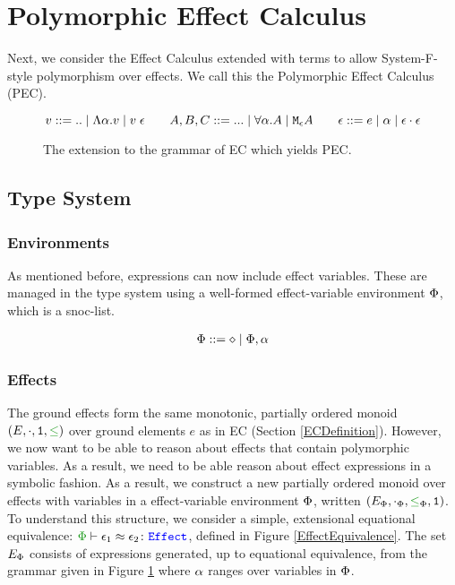 \section{Polymorphic Effect Calculus}


Next, we consider the Effect Calculus extended with terms to allow System-F-style polymorphism over effects. We call this the Polymorphic Effect Calculus (PEC).

\begin{figure}[H]
    \centering
    \begin{framed}
        
\[
    v::=\text{..}\mid\elam{\a}{v}\mid\eapp{v}{\e}
    \quad\quad
    A, B, C::=\text{...}\mid \all{\a}{A}\mid\mea
    \quad\quad
    \e ::= e \mid \a \mid \e\dot\e
\]
    \end{framed}
    \caption{The extension to the grammar of EC which yields PEC.}
    \label{PECExtension}
\end{figure}

\subsection{Type System}
\label{PECTypeSystem}
\subsubsection{Environments}
As mentioned before, expressions can now include effect variables. These are managed in the type system using a well-formed effect-variable environment $\P$, which is a snoc-list.

\begin{align*}
    \P ::= \nil \mid \P, \a
\end{align*}



\subsubsection{Effects}
The ground effects form the same monotonic, partially ordered monoid $(E, \dot, \1, \subeffect)$ over ground elements $e$ as in EC (Section \ref{ECDefinition}). However, we now want to be able to reason about effects that contain polymorphic variables. As a  result, we need to be able reason about effect expressions in a symbolic fashion. As a result, we construct a new partially ordered monoid over effects with variables in a effect-variable environment $\P$, written $(E_\P, \dotp, \subeffectp, \1)$. To understand this structure, we consider a simple, extensional equational equivalence: $\zpberelation{\e_1}{\e_2}{\effect}$, defined in Figure \ref{EffectEquivalence}. The set $E_\P$ consists of expressions generated, up to equational equivalence, from the grammar given in Figure \ref{PECExtension} where $\a$ ranges over variables in $\P$.

